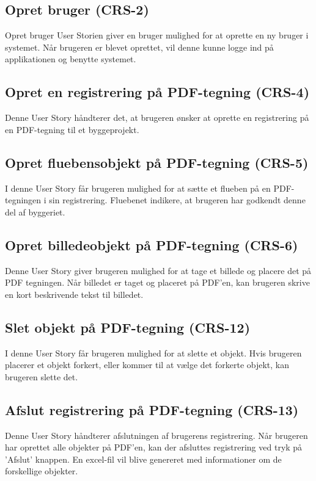 	\subsection*{Opret bruger (CRS-2)}
	Opret bruger User Storien giver en bruger mulighed for at oprette en ny bruger i systemet. Når brugeren er blevet oprettet, vil denne kunne logge ind på applikationen og benytte systemet.
	
	\subsection*{Opret en registrering på PDF-tegning (CRS-4)}
	Denne User Story håndterer det, at brugeren ønsker at oprette en registrering på en PDF-tegning til et byggeprojekt.
	
	\subsection*{Opret fluebensobjekt på PDF-tegning (CRS-5)}
	I denne User Story får brugeren mulighed for at sætte et flueben på en PDF-tegningen i sin registrering. Fluebenet indikere, at brugeren har godkendt denne del af byggeriet.

	\subsection*{Opret billedeobjekt på PDF-tegning (CRS-6)}
	Denne User Story giver brugeren mulighed for at tage et billede og placere det på PDF tegningen. Når billedet er taget og placeret på PDF'en, kan brugeren skrive en kort beskrivende tekst til billedet.
		
	\subsection*{Slet objekt på PDF-tegning (CRS-12)}
	I denne User Story får brugeren mulighed for at slette et objekt. Hvis brugeren placerer et objekt forkert, eller kommer til at vælge det forkerte objekt, kan brugeren slette det. 

	\subsection*{Afslut registrering på PDF-tegning (CRS-13)}
	Denne User Story håndterer afslutningen af brugerens registrering. Når brugeren har oprettet alle objekter på PDF'en, kan der afsluttes registrering ved tryk på 'Afslut' knappen. En excel-fil vil blive genereret med informationer om de forskellige objekter.
	
